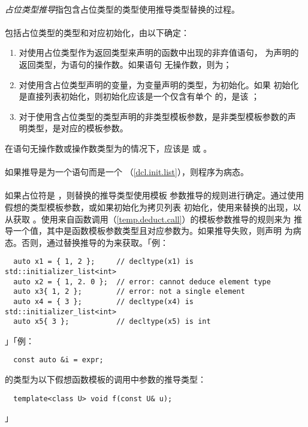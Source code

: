 \paragraph{}
\textit{占位类型推导}指包含占位类型的类型使用推导类型替换的过程。

\paragraph{}
包括占位类型的类型和对应初始化，由以下确定：
\begin{enumerate}
  \item{对使用占位类型作为返回类型来声明的函数中出现的非弃值语句，
    为声明的返回类型，为语句的操作数。如果语句
    无操作数，则为；}
  \item{对使用含占位类型声明的变量，为变量声明的类型，为初始化。如果
    初始化是直接列表初始化，则初始化应该是一个仅含有单个
    的，是该
    ；}
  \item{对于使用含占位类型的类型声明的非类型模板参数，是非类型模板参数的声
    明类型，是对应的模板参数。}
\end{enumerate}
在语句无操作数或操作数类型为的情况下，应该是
或 。

\paragraph{}
如果推导是为一个语句而是一个
（\ref{dcl.init.list}），则程序为病态。

\paragraph{}
如果占位符是 ，则替换的推导类型使用模板
参数推导的规则进行确定。通过使用假想的类型模板参数，或如果初始化为拷贝列表
初始化，使用来替换的出现，以从获取
。使用来自函数调用（\ref{temp.deduct.call}）的模板参数推导的规则来为
推导一个值，其中是函数模板参数类型且对应参数为。如果推导失败，则声明
为病态。否则，通过替换推导的为来获取。「例：
\begin{lstlisting}
  auto x1 = { 1, 2 };     // decltype(x1) is std::initializer_list<int>
  auto x2 = { 1, 2. 0 };  // error: cannot deduce element type
  auto x3{ 1, 2 };        // error: not a single element
  auto x4 = { 3 };        // decltype(x4) is std::initializer_list<int>
  auto x5{ 3 };           // decltype(x5) is int
\end{lstlisting}」「例：
\begin{lstlisting}
  const auto &i = expr;
\end{lstlisting}
的类型为以下假想函数模板的调用中参数的推导类型：
\begin{lstlisting}
  template<class U> void f(const U& u);
\end{lstlisting}」

